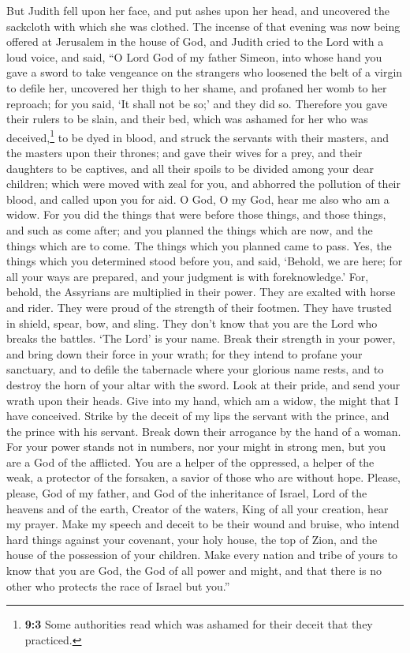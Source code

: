  But Judith fell upon her face, and put ashes upon her
head, and uncovered the sackcloth with which she was clothed. The
incense of that evening was now being offered at Jerusalem in the house
of God, and Judith cried to the Lord with a loud voice, and said,
 ``O Lord God of my father Simeon, into whose hand you
gave a sword to take vengeance on the strangers who loosened the belt of
a virgin to defile her, uncovered her thigh to her shame, and profaned
her womb to her reproach; for you said, `It shall not be so;' and they
did so.  Therefore you gave their rulers to be slain, and
their bed, which was ashamed for her who was deceived,\footnote{\textbf{9:3}
  Some authorities read which was ashamed for their deceit that they
  practiced.} to be dyed in blood, and struck the servants with their
masters, and the masters upon their thrones;  and gave
their wives for a prey, and their daughters to be captives, and all
their spoils to be divided among your dear children; which were moved
with zeal for you, and abhorred the pollution of their blood, and called
upon you for aid. O God, O my God, hear me also who am a widow.
 For you did the things that were before those things, and
those things, and such as come after; and you planned the things which
are now, and the things which are to come. The things which you planned
came to pass.  Yes, the things which you determined stood
before you, and said, `Behold, we are here; for all your ways are
prepared, and your judgment is with foreknowledge.'  For,
behold, the Assyrians are multiplied in their power. They are exalted
with horse and rider. They were proud of the strength of their footmen.
They have trusted in shield, spear, bow, and sling. They don't know that
you are the Lord who breaks the battles. `The Lord' is your name.
 Break their strength in your power, and bring down their
force in your wrath; for they intend to profane your sanctuary, and to
defile the tabernacle where your glorious name rests, and to destroy the
horn of your altar with the sword.  Look at their pride,
and send your wrath upon their heads. Give into my hand, which am a
widow, the might that I have conceived.  Strike by the
deceit of my lips the servant with the prince, and the prince with his
servant. Break down their arrogance by the hand of a woman.
 For your power stands not in numbers, nor your might in
strong men, but you are a God of the afflicted. You are a helper of the
oppressed, a helper of the weak, a protector of the forsaken, a savior
of those who are without hope.  Please, please, God of my
father, and God of the inheritance of Israel, Lord of the heavens and of
the earth, Creator of the waters, King of all your creation, hear my
prayer.  Make my speech and deceit to be their wound and
bruise, who intend hard things against your covenant, your holy house,
the top of Zion, and the house of the possession of your children.
 Make every nation and tribe of yours to know that you
are God, the God of all power and might, and that there is no other who
protects the race of Israel but you.''

